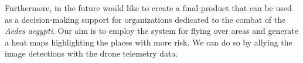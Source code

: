 Furthermore, in the future would like to create a final product that can be used as a decision-making support for organizations dedicated to the combat of the \textit{Aedes aegypti}.
Our aim is to employ the system for flying over areas and generate a heat maps highlighting the places with more risk.
We can do so by allying the image detections with the drone telemetry data.

% 
% 
